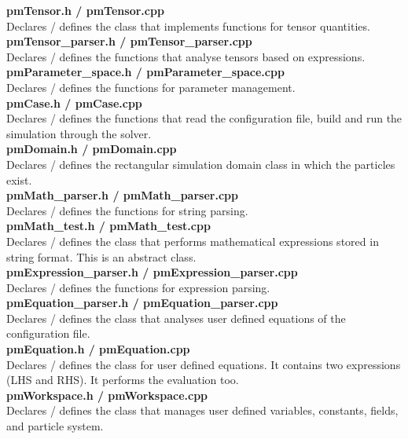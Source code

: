 \documentclass[a4paper,12pt,openany]{book}
\theoremstyle{break}
\begin{document}
\textbf{pmTensor.h / pmTensor.cpp} \\
Declares / defines the class that implements functions for tensor quantities. \\

\textbf{pmTensor\_parser.h / pmTensor\_parser.cpp} \\
Declares / defines the functions that analyse tensors based on expressions. \\

\textbf{pmParameter\_space.h / pmParameter\_space.cpp} \\
Declares / defines the functions for parameter management. \\

\textbf{pmCase.h / pmCase.cpp} \\
Declares / defines the functions that read the configuration file, build and run the simulation through the solver. \\

\textbf{pmDomain.h / pmDomain.cpp} \\
Declares / defines the rectangular simulation domain class in which the particles exist. \\

\textbf{pmMath\_parser.h / pmMath\_parser.cpp} \\
Declares / defines the functions for string parsing. \\

\textbf{pmMath\_test.h / pmMath\_test.cpp} \\
Declares / defines the class that performs mathematical expressions stored in string format. This is an abstract class. \\

\textbf{pmExpression\_parser.h / pmExpression\_parser.cpp} \\
Declares / defines the functions for expression parsing. \\

\textbf{pmEquation\_parser.h / pmEquation\_parser.cpp} \\
Declares / defines the class that analyses user defined equations of the configuration file. \\

\textbf{pmEquation.h / pmEquation.cpp} \\
Declares / defines the class for user defined equations. It contains two expressions (LHS and RHS). It performs the evaluation too. \\

\textbf{pmWorkspace.h / pmWorkspace.cpp} \\
Declares / defines the class that manages user defined variables, constants, fields, and particle system. \\
\end{document}
